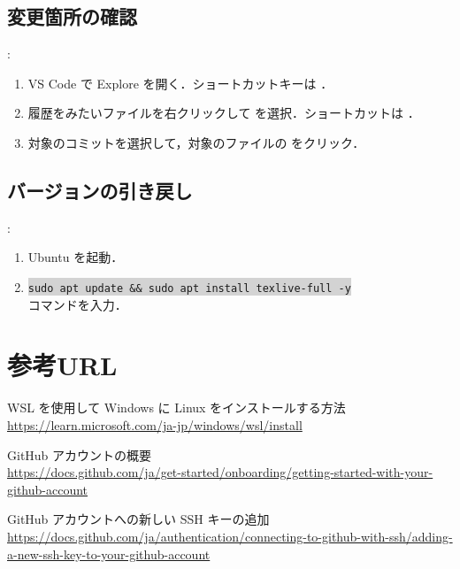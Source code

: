 \documentclass[aspectratio=169,dvipdfmx,cjk]{beamer}
\newcommand{\cmdline}[1]{
    \colorbox{lightgray}{\lstinline[style=command]{#1}}
}
\begin{document}
\subsection{変更箇所の確認}
\begin{frame}{\insertsection \thesubsection: \insertsubsection}
  \begin{enumerate}
    \item VS Code で Explore を開く．ショートカットキーは ．
    \item 履歴をみたいファイルを右クリックして を選択．ショートカットは ．
    \item 対象のコミットを選択して，対象のファイルの  をクリック．
  \end{enumerate}
\end{frame}

\subsection{バージョンの引き戻し}
\begin{frame}{\insertsection \thesubsection: \insertsubsection}
  \begin{enumerate}
    \item Ubuntu を起動．
    \item \cmdline{sudo apt update && sudo apt install texlive-full -y}\\ コマンドを入力．
  \end{enumerate}
\end{frame}

\section*{参考URL}
\begin{frame}{\insertsection}
  \begin{thebibliography}{99}
  \beamertemplatetextbibitems

   WSL を使用して Windows に Linux をインストールする方法\\
  \href{https://learn.microsoft.com/ja-jp/windows/wsl/install}{https://learn.microsoft.com/ja-jp/windows/wsl/install}
  
   GitHub アカウントの概要\\
  \href{https://docs.github.com/ja/get-started/onboarding/getting-started-with-your-github-account
  }{https://docs.github.com/ja/get-started/onboarding/getting-started-with-your-github-account}
  
   GitHub アカウントへの新しい SSH キーの追加\\
  \href{https://docs.github.com/ja/authentication/connecting-to-github-with-ssh/adding-a-new-ssh-key-to-your-github-account
  }{https://docs.github.com/ja/authentication/connecting-to-github-with-ssh/adding-a-new-ssh-key-to-your-github-account}
    
  \end{thebibliography}
\end{frame}
\end{document}
